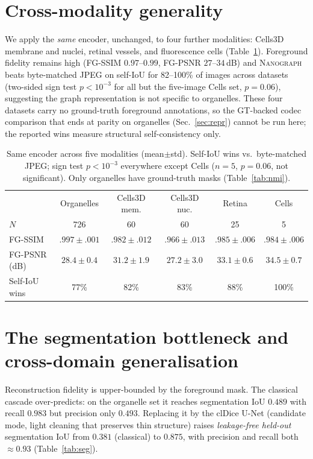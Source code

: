 \documentclass[runningheads]{llncs}
\newcommand{\method}{\textsc{Nanograph}\xspace}
\begin{document}
\section{Cross-modality generality}\label{sec:cross}
We apply the \emph{same} encoder, unchanged, to four further modalities:
Cells3D membrane and nuclei, retinal vessels, and fluorescence cells
(Table~\ref{tab:cross}). Foreground fidelity remains high (FG-SSIM
$0.97$--$0.99$, FG-PSNR $27$--$34$\,dB) and \method beats byte-matched JPEG on
self-IoU for 82--100\% of images across datasets (two-sided sign test
$p<10^{-3}$ for all but the five-image Cells set, $p=0.06$), suggesting the
graph representation is not specific to organelles. These four datasets carry
no ground-truth foreground annotations, so the GT-backed codec comparison that
ends at parity on organelles (Sec.~\ref{sec:repr}) cannot be run here; the
reported wins measure structural self-consistency only.

\begin{table}[t]
\centering
\caption{Same encoder across five modalities (mean$\pm$std). Self-IoU wins vs.\
byte-matched JPEG; sign test $p<10^{-3}$ everywhere except Cells ($n{=}5$,
$p=0.06$, not significant). Only organelles have ground-truth masks
(Table~\ref{tab:nmi}).}
\label{tab:cross}
\setlength{\tabcolsep}{3pt}
\begin{tabular}{lccccc}
\toprule
 & Organelles & Cells3D mem. & Cells3D nuc. & Retina & Cells \\
$N$ & 726 & 60 & 60 & 25 & 5\\
\midrule
FG-SSIM       & $.997{\pm}.001$ & $.982{\pm}.012$ & $.966{\pm}.013$ & $.985{\pm}.006$ & $.984{\pm}.006$\\
FG-PSNR (dB)  & $28.4{\pm}0.4$  & $31.2{\pm}1.9$  & $27.2{\pm}3.0$  & $33.1{\pm}0.6$ & $34.5{\pm}0.7$\\
Self-IoU wins & 77\%  & 82\%  & 83\%  & 88\%  & 100\%\\
\bottomrule
\end{tabular}
\end{table}

\section{The segmentation bottleneck and cross-domain generalisation}\label{sec:seg}
Reconstruction fidelity is upper-bounded by the foreground mask. The classical
cascade over-predicts: on the organelle set it reaches segmentation IoU $0.489$
with recall $0.983$ but precision only $0.493$. Replacing it by the clDice U-Net
(candidate mode, light cleaning that preserves thin structure) raises
\emph{leakage-free held-out} segmentation IoU from $0.381$ (classical) to
$0.875$, with precision and recall both $\approx0.93$ (Table~\ref{tab:seg}).
\end{document}
